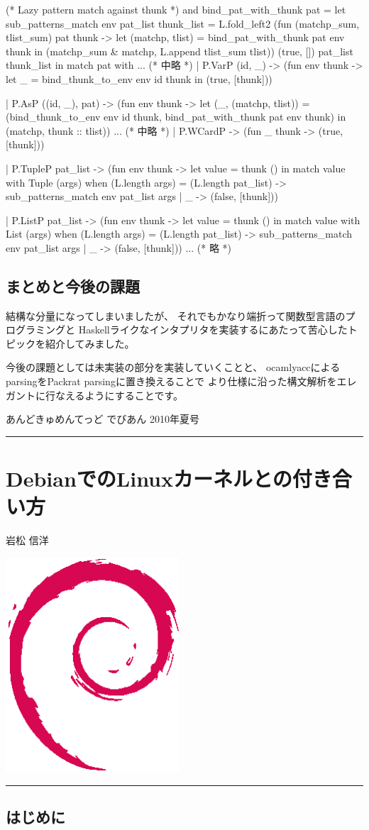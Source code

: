\documentclass[mingoth,a4paper]{jsarticle}
\renewcommand{\dancersection}[2]{%
\newpage
あんどきゅめんてっど でびあん 2010年夏号
%
\vspace{0.1mm}\\
{\color{dancerlightblue}\rule{\hsize}{2mm}}

%
%
\begin{minipage}[t]{0.6\hsize}
\color{dancerdarkblue}
\vspace{1cm}
\section{#1}
\hfill{}#2\\
\end{minipage}
\begin{minipage}[t]{0.4\hsize}
\vspace{-2cm}
\hfill{}\includegraphics[height=8cm]{image200502/openlogo-nd.eps}\\
\vspace{-5cm}
\end{minipage}
%
%
{\color{dancerdarkblue}\rule{0.74\hsize}{2mm}}
%
\vspace{2cm}
}
\begin{document}
\begin{commandline}
(* Lazy pattern match against thunk *)
and bind_pat_with_thunk pat =
  let sub_patterns_match env pat_list thunk_list =
    L.fold_left2
      (fun (matchp_sum, tlist_sum) pat thunk ->
         let (matchp, tlist) = bind_pat_with_thunk pat env thunk in
           (matchp_sum & matchp, L.append tlist_sum tlist))
      (true, [])
      pat_list
      thunk_list
  in
    match pat with
... (* 中略 *)
      | P.VarP (id, _) ->
          (fun env thunk ->
             let _ = bind_thunk_to_env env id thunk in (true, [thunk]))

      | P.AsP ((id, _), pat) ->
          (fun env thunk ->
             let (_, (matchp, tlist)) = (bind_thunk_to_env env id thunk,
                                         bind_pat_with_thunk pat env thunk)
             in (matchp, thunk :: tlist))
... (* 中略 *)
      | P.WCardP ->
          (fun _ thunk -> (true, [thunk]))

      | P.TupleP pat_list ->
          (fun env thunk ->
             let value = thunk () in
               match value with
                   Tuple (args) when (L.length args) = (L.length pat_list)
                     -> sub_patterns_match env pat_list args
                 | _ -> (false, [thunk]))

      | P.ListP pat_list ->
          (fun env thunk -> 
             let value = thunk () in
               match value with
                   List (args) when (L.length args) = (L.length pat_list)
                     -> sub_patterns_match env pat_list args
                 | _ -> (false, [thunk]))
... (* 略 *)
\end{commandline}

\subsection{まとめと今後の課題}

結構な分量になってしまいましたが、
それでもかなり端折って関数型言語のプログラミングと
Haskellライクなインタプリタを実装するにあたって苦心したトピックを紹介してみました。

今後の課題としては未実装の部分を実装していくことと、
ocamlyaccによるparsingをPackrat parsingに置き換えることで
より仕様に沿った構文解析をエレガントに行なえるようにすることです。

\dancersection{DebianでのLinuxカーネルとの付き合い方}{岩松 信洋}

\subsection{はじめに}
\end{document}
